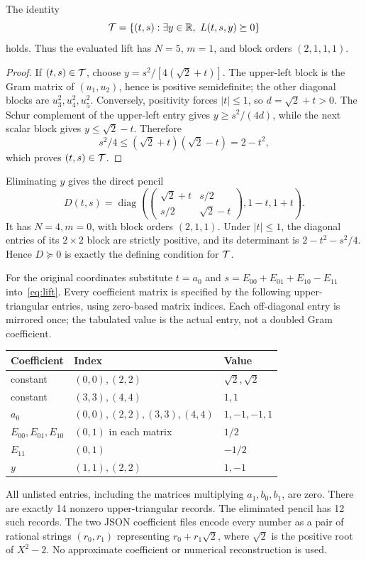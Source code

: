\begin{proposition}\label{prop:lift}
The identity
\[
 \T=\{(t,s):\exists y\in\R,\ L(t,s,y)\succeq0\}
\]
holds. Thus the evaluated lift has $N=5$, $m=1$, and block orders $(2,1,1,1)$.
\end{proposition}
\begin{proof}
If $(t,s)\in\mathcal T$, choose $y=s^2/[4(\sqrt2+t)]$. The upper-left block is the Gram matrix of $(u_1,u_2)$, hence is positive semidefinite; the other diagonal blocks are $u_3^2,u_4^2,u_5^2$. Conversely, positivity forces $|t|\le1$, so $d=\sqrt2+t>0$. The Schur complement of the upper-left entry gives $y\ge s^2/(4d)$, while the next scalar block gives $y\le\sqrt2-t$. Therefore
\[
 s^2/4\le(\sqrt2+t)(\sqrt2-t)=2-t^2,
\]
which proves $(t,s)\in\mathcal T$.
\end{proof}

Eliminating $y$ gives the direct pencil
\begin{equation}\label{eq:direct}
 D(t,s)=\operatorname{diag}\left(
 \begin{pmatrix}\sqrt2+t&s/2\\s/2&\sqrt2-t\end{pmatrix},
 1-t,1+t\right).
\end{equation}
It has $N=4,m=0$, with block orders $(2,1,1)$. Under $|t|\le1$, the diagonal entries of its $2\times2$ block are strictly positive, and its determinant is $2-t^2-s^2/4$. Hence $D\succeq0$ is exactly the defining condition for $\mathcal T$.

For the original coordinates substitute $t=a_0$ and $s=E_{00}+E_{01}+E_{10}-E_{11}$ into~\eqref{eq:lift}. Every coefficient matrix is specified by the following upper-triangular entries, using zero-based matrix indices. Each off-diagonal entry is mirrored once; the tabulated value is the actual entry, not a doubled Gram coefficient.
\begin{center}
\begin{tabular}{lll}
\toprule
Coefficient&Index&Value\\\midrule
constant&$(0,0),(2,2)$&$\sqrt2,\sqrt2$\\
constant&$(3,3),(4,4)$&$1,1$\\
$a_0$&$(0,0),(2,2),(3,3),(4,4)$&$1,-1,-1,1$\\
$E_{00},E_{01},E_{10}$&$(0,1)$ in each matrix&$1/2$\\
$E_{11}$&$(0,1)$&$-1/2$\\
$y$&$(1,1),(2,2)$&$1,-1$\\\bottomrule
\end{tabular}
\end{center}
All unlisted entries, including the matrices multiplying $a_1,b_0,b_1$, are zero. There are exactly 14 nonzero upper-triangular records. The eliminated pencil has 12 such records. The two JSON coefficient files encode every number as a pair of rational strings $(r_0,r_1)$ representing $r_0+r_1\sqrt2$, where $\sqrt2$ is the positive root of $X^2-2$. No approximate coefficient or numerical reconstruction is used.

